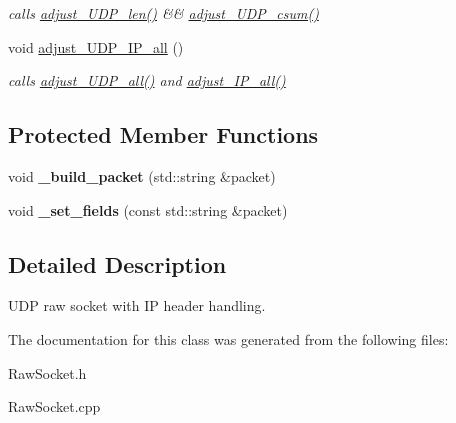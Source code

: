 \begin{CompactItemize}
\begin{CompactList}\small\item\em calls \hyperlink{classsocketpp_1_1UDP__RawSocket_1caa413cfe4f72d8c0aeccdcb10469b5}{adjust\_\-UDP\_\-len()} \&\& \hyperlink{classsocketpp_1_1UDP__IP__RawSocket_6c2f6c375cec90f64fd093af37369d6a}{adjust\_\-UDP\_\-csum()} \item\end{CompactList}\item 
\hypertarget{classsocketpp_1_1UDP__IP__RawSocket_1a0f6360760f94f5c1569adde67d6d1b}{
void \hyperlink{classsocketpp_1_1UDP__IP__RawSocket_1a0f6360760f94f5c1569adde67d6d1b}{adjust\_\-UDP\_\-IP\_\-all} ()}
\label{classsocketpp_1_1UDP__IP__RawSocket_1a0f6360760f94f5c1569adde67d6d1b}

\begin{CompactList}\small\item\em calls \hyperlink{classsocketpp_1_1UDP__IP__RawSocket_94bec31d8c856ccdafa083c74b8b7e58}{adjust\_\-UDP\_\-all()} and \hyperlink{classsocketpp_1_1IP__RawSocket_45e60510233daaa2f279d3a4706fdce5}{adjust\_\-IP\_\-all()} \item\end{CompactList}\end{CompactItemize}
\subsection*{Protected Member Functions}
\begin{CompactItemize}
\item 
\hypertarget{classsocketpp_1_1UDP__IP__RawSocket_16035f1b701b898f0e4de44a9ac8bbb3}{
void \textbf{\_\-build\_\-packet} (std::string \&packet)}
\label{classsocketpp_1_1UDP__IP__RawSocket_16035f1b701b898f0e4de44a9ac8bbb3}

\item 
\hypertarget{classsocketpp_1_1UDP__IP__RawSocket_40fde867fa138b495f660864023a3eb1}{
void \textbf{\_\-set\_\-fields} (const std::string \&packet)}
\label{classsocketpp_1_1UDP__IP__RawSocket_40fde867fa138b495f660864023a3eb1}

\end{CompactItemize}


\subsection{Detailed Description}
UDP raw socket with IP header handling. 

The documentation for this class was generated from the following files:\begin{CompactItemize}
\item 
RawSocket.h\item 
RawSocket.cpp\end{CompactItemize}
